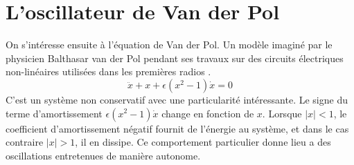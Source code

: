 \chapter{L'oscillateur de Van der Pol}
%
On s'intéresse ensuite à l'équation de Van der Pol. Un modèle imaginé par le physicien Balthasar van der Pol
pendant ses travaux sur des circuits électriques non-linéaires utilisées dans les premières radios \cite{strogatz_nonlinear_2015}.
%
\begin{equation}
    \ddot{x} + x + \epsilon(x^2 - 1)\dot{x} = 0
    \label{eq:vdp}
\end{equation}
%
C'est un système non conservatif avec une particularité intéressante. 
Le signe du terme d'amortissement $\epsilon(x^2 - 1)\dot{x}$ change en fonction de $x$. 
Lorsque $|x|<1$, le coefficient d'amortissement négatif fournit de l'énergie au système, et dans le cas contraire $|x|>1$, il en dissipe. 
Ce comportement particulier donne lieu a des oscillations entretenues de manière autonome.

